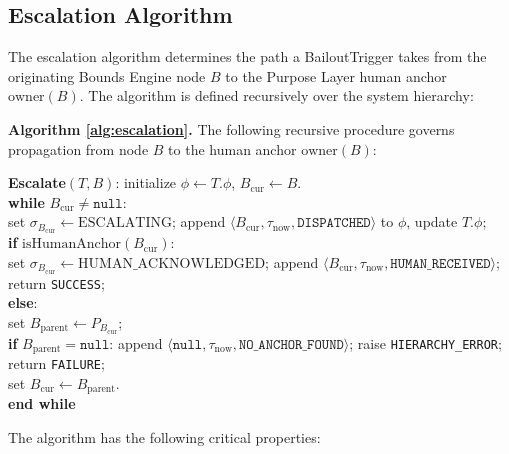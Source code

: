 \subsection{Escalation Algorithm}
\label{sec:escalation-algorithm}

The escalation algorithm determines the path a BailoutTrigger takes from the originating Bounds Engine node $B$ to the Purpose Layer human anchor $\text{owner}(B)$. The algorithm is defined recursively over the system hierarchy:

\bigskip

\noindent\textbf{Algorithm \ref{alg:escalation}.}
The following recursive procedure governs propagation from node $B$ to the human anchor $\text{owner}(B)$:

\begin{trivlist}\item[]\raggedright
\textbf{Escalate}$(T, B)$: initialize $\phi \leftarrow T.\phi$, $B_{\text{cur}} \leftarrow B$.\\[3pt]
\textbf{while} $B_{\text{cur}} \neq \texttt{null}$:\\[3pt]
\quad set $\sigma_{B_{\text{cur}}} \leftarrow \text{ESCALATING}$; append $\langle B_{\text{cur}}, \tau_{\text{now}}, \texttt{DISPATCHED}\rangle$ to $\phi$, update $T.\phi$;\\[3pt]
\quad \textbf{if} $\text{isHumanAnchor}(B_{\text{cur}})$:\\[3pt]
\quad\quad set $\sigma_{B_{\text{cur}}} \leftarrow \text{HUMAN\_ACKNOWLEDGED}$; append $\langle B_{\text{cur}}, \tau_{\text{now}}, \texttt{HUMAN\_RECEIVED}\rangle$; return \texttt{SUCCESS};\\[3pt]
\quad \textbf{else}:\\[3pt]
\quad\quad set $B_{\text{parent}} \leftarrow P_{B_{\text{cur}}}$;\\[3pt]
\quad\quad \textbf{if} $B_{\text{parent}} = \texttt{null}$: append $\langle \texttt{null}, \tau_{\text{now}}, \texttt{NO\_ANCHOR\_FOUND}\rangle$; raise \texttt{HIERARCHY\_ERROR}; return \texttt{FAILURE};\\[3pt]
\quad\quad set $B_{\text{cur}} \leftarrow B_{\text{parent}}$.\\[3pt]
\textbf{end while}
\end{trivlist}

\bigskip

The algorithm has the following critical properties:

